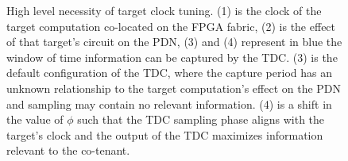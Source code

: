 \begin{figure}[htbp]
  \centering
  
  \caption{High level necessity of target clock tuning. (1) is the clock of the target computation co-located on the FPGA fabric, (2) is the effect of that target's circuit on the PDN, (3) and (4) represent in blue the window of time information can be captured by the TDC. (3) is the default configuration of the TDC, where the capture period has an unknown relationship to the target computation's effect on the PDN and sampling may contain no relevant information. (4) is a shift in the value of $\phi$ such that the TDC sampling phase aligns with the target's clock and the output of the TDC maximizes information relevant to the co-tenant.}
  \label{fig:capture-miss}
\end{figure}